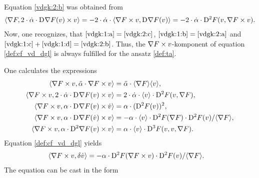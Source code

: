 Equation \eqref{vdgk:2:b} was obtained from
\begin{align*}
    \langle  \nabla F ,  2 \cdot \dot{ \alpha } \cdot \mathrm{D}^{  }\nabla F( v ) \times v  \rangle   =
    - 2 \cdot \dot{ \alpha } \cdot
    \langle  \nabla F \times v ,  \mathrm{D}^{  } \nabla F( v )   \rangle   =
    - 2 \cdot \dot{ \alpha } \cdot \mathrm{D}^{ 2 }F( v, \nabla F \times v ) .
\end{align*}
Now, one recognizes, that $ \eqref{vdgk:1:a}  =  \eqref{vdgk:2:c} $,
$ \eqref{vdgk:1:b}  =  \eqref{vdgk:2:a} $ and
$ \eqref{vdgk:1:c} + \eqref{vdgk:1:d}  =  \eqref{vdgk:2:b} $.
Thus, the $ \nabla F \times v $-komponent of equation \eqref{def:cf_vd_dgl}
is always fulfilled for the ansatz \eqref{def:ta}.



One calculates the expressions
\begin{subequations}
    \begin{align}
        \langle  \nabla F  \times v ,  \ddot{ \alpha } \cdot \nabla F  \times v  \rangle
        &=
        \ddot{ \alpha } \cdot \langle  \nabla F   \rangle \langle  v  \rangle ,
        \\
        \langle  \nabla F  \times v ,  2 \cdot \dot{ \alpha } \cdot \mathrm{D}^{  } \nabla F  ( v ) \times v  \rangle
        &=
        2 \cdot \dot{ \alpha } \cdot \langle  v  \rangle \cdot \mathrm{D}^{ 2 } F ( v, \nabla F  ) ,
        \\
        \langle  \nabla F  \times v ,  \alpha \cdot \mathrm{D}^{  } \nabla F  ( v ) \times \dot{ v }  \rangle
        &=
        \alpha \cdot  ( \mathrm{D}^{ 2 } F ( v ) )^2 ,
        \\
        \langle  \nabla F  \times v ,  \alpha \cdot \mathrm{D}^{  } \nabla F  ( \dot{ v } ) \times v  \rangle
        &=
        - \alpha \cdot \langle  v  \rangle \cdot \mathrm{D}^{ 2 } F ( \nabla F  ) \cdot
        \mathrm{D}^{ 2 } F ( v ) / \langle  \nabla F   \rangle ,
        \\
        \langle  \nabla F  \times v ,  \alpha \cdot \mathrm{D}^{ 2 } \nabla F  ( v ) \times v  \rangle
        &=
        \alpha \cdot \langle  v  \rangle \cdot \mathrm{D}^{ 3 } F ( v, v, \nabla F  ) .
    \end{align}
\end{subequations}
Equation \eqref{def:cf_vd_dgl} yields
\begin{align}
    \langle  \nabla F  \times v ,  \delta \dot{ v }  \rangle
    &=
    -\alpha \cdot \mathrm{D}^{ 2 } F ( \nabla F  \times v ) \cdot
    \mathrm{D}^{ 2 } F ( v ) / \langle  \nabla F   \rangle .
\end{align}
The equation can be cast in the form
